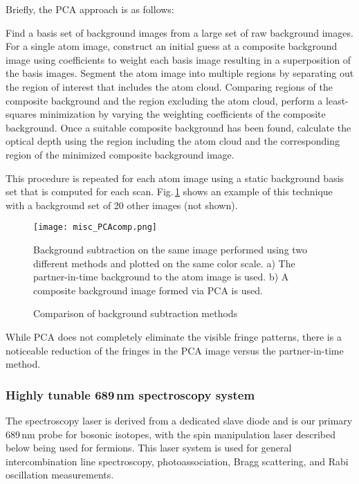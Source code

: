 Briefly, the PCA approach is as follows:
\begin{outline}[enumerate]
	\1 Find a basis set of background images from a large set of raw background images.
	\1 For a single atom image, construct an initial guess at a composite background image using coefficients to weight each basis image resulting in a superposition of the basis images.
	\1 Segment the atom image into multiple regions by separating out the region of interest that includes the atom cloud.
	\1 Comparing regions of the composite background and the region excluding the atom cloud, perform a least-squares minimization by varying the weighting coefficients of the composite background.
	\1 Once a suitable composite background has been found, calculate the optical depth using the region including the atom cloud and the corresponding region of the minimized composite background image.
\end{outline}
This procedure is repeated for each atom image using a static background basis set that is computed for each scan.
Fig.\,\ref{fig:PCAcomp} shows an example of this technique with a background set of 20 other images (not shown).
	\begin{figure}
	\centerline{
		\texttt{[image: misc\_PCAcomp.png]}}
		\caption{Comparison of background subtraction methods}{Background subtraction on the same image performed using two different methods and plotted on the same color scale. a) The partner-in-time background to the atom image is used. b) A composite background image formed via PCA is used.}
		 \label{fig:PCAcomp}
	\end{figure}
While PCA does not completely eliminate the visible fringe patterns, there is a noticeable reduction of the fringes in the PCA image versus the partner-in-time method.

\subsubsection{Highly tunable 689\,nm spectroscopy system} \label{sec:specSlave}
The spectroscopy laser is derived from a dedicated slave diode and is our primary 689\,nm probe for bosonic isotopes, with the spin manipulation laser described below being used for fermions.
This laser system is used for general intercombination line spectroscopy, photoassociation, Bragg scattering, and Rabi oscillation measurements.

